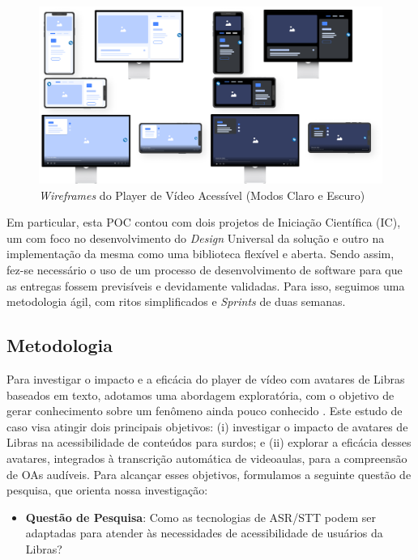 \begin{figure}[htbp]
\centering
\caption{\textit{Wireframes} do Player de Vídeo Acessível (Modos Claro e Escuro)}
\label{fig:chapter4-cs2-poc-wireframes}
\includegraphics[width=1\textwidth]{images/chapter4-cs2-poc-wireframes.png}
\fautor
\end{figure}

Em particular, esta POC contou com dois projetos de Iniciação Científica (IC), um com foco no desenvolvimento do \textit{Design} Universal da solução e outro na implementação da mesma como uma biblioteca flexível e aberta. Sendo assim, fez-se necessário o uso de um processo de desenvolvimento de software para que as entregas fossem previsíveis e devidamente validadas. Para isso, seguimos uma metodologia ágil, com ritos simplificados e \textit{Sprints} de duas semanas.

\subsection{Metodologia}

Para investigar o impacto e a eficácia do player de vídeo com avatares de Libras baseados em texto, adotamos uma abordagem exploratória, com o objetivo de gerar conhecimento sobre um fenômeno ainda pouco conhecido \cite{CastroFilho2021}. Este estudo de caso visa atingir dois principais objetivos: (i) investigar o impacto de avatares de Libras na acessibilidade de conteúdos para surdos; e (ii) explorar a eficácia desses avatares, integrados à transcrição automática de videoaulas, para a compreensão de OAs audíveis. Para alcançar esses objetivos, formulamos a seguinte questão de pesquisa, que orienta nossa investigação:

\begin{itemize}
\item \textbf{Questão de Pesquisa}: Como as tecnologias de ASR/STT podem ser adaptadas para atender às necessidades de acessibilidade de usuários da Libras?
\end{itemize}


